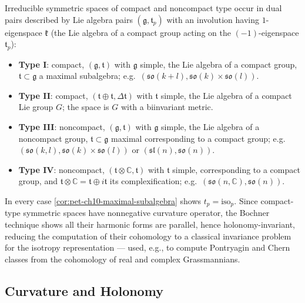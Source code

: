 \begin{definition}
  \label{def:pet-ch10-symmetric-space-type-I-IV}

  Irreducible symmetric spaces of compact and noncompact type occur in dual
  pairs described by Lie algebra pairs $(\mathfrak g,\mathfrak t_p)$ with an
  involution having $1$-eigenspace $\mathfrak k$ (the Lie algebra of a compact
  group acting on the $(-1)$-eigenspace $\mathfrak t_p$):
  \begin{itemize}
    \item \textbf{Type I}: compact, $(\mathfrak g,\mathfrak t)$ with $\mathfrak g$
      simple, the Lie algebra of a compact group, $\mathfrak t\subset\mathfrak g$
      a maximal subalgebra; e.g.\ $(\mathfrak{so}(k+l),\mathfrak{so}(k)\times\mathfrak{so}(l))$.
    \item \textbf{Type II}: compact, $(\mathfrak t\oplus\mathfrak t,\Delta\mathfrak t)$
      with $\mathfrak t$ simple, the Lie algebra of a compact Lie group $G$; the
      space is $G$ with a biinvariant metric.
    \item \textbf{Type III}: noncompact, $(\mathfrak g,\mathfrak t)$ with
      $\mathfrak g$ simple, the Lie algebra of a noncompact group,
      $\mathfrak t\subset\mathfrak g$ maximal corresponding to a compact group;
      e.g.\ $(\mathfrak{so}(k,l),\mathfrak{so}(k)\times\mathfrak{so}(l))$ or
      $(\mathfrak{sl}(n),\mathfrak{so}(n))$.
    \item \textbf{Type IV}: noncompact, $(\mathfrak t\otimes\mathbb C,\mathfrak t)$
      with $\mathfrak t$ simple, corresponding to a compact group, and
      $\mathfrak t\otimes\mathbb C=\mathfrak t\oplus i\mathfrak t$ its
      complexification; e.g.\ $(\mathfrak{so}(n,\mathbb C),\mathfrak{so}(n))$.
  \end{itemize}
  In every case \cref{cor:pet-ch10-maximal-subalgebra} shows $t_p=\mathrm{iso}_p$.
  Since compact-type symmetric spaces have nonnegative curvature operator, the
  Bochner technique shows all their harmonic forms are parallel, hence
  holonomy-invariant, reducing the computation of their cohomology to a
  classical invariance problem for the isotropy representation — used, e.g., to
  compute Pontryagin and Chern classes from the cohomology of real and complex
  Grassmannians.
\end{definition}

\subsection{Curvature and Holonomy}

